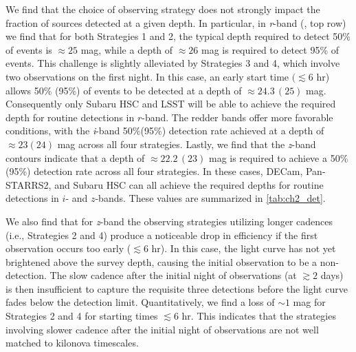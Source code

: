 \clearpage
We find that the choice of observing strategy does not strongly impact the fraction of sources detected at a given depth. In particular, in {\em r}-band (, top row) we find that for both Strategies 1 and 2, the typical depth required to detect 50\% of events is $\approx25$ mag, while a depth of $\approx26$ mag is required to detect 95\% of events. This challenge is slightly alleviated by Strategies 3 and 4, which involve two observations on the first night. In this case, an early start time $(\lesssim 6$ hr) allows 50\% (95\%) of events to be detected at a depth of $\approx24.3\,(25)$ mag. Consequently only Subaru HSC and LSST will be able to achieve the required depth for routine detections in $r$-band. The redder bands offer more favorable conditions, with the {\em i}-band 50\%(95\%) detection rate achieved at a depth of $\approx 23(24)$ mag across all four strategies. Lastly, we find that the {\em z}-band contours indicate that a depth of $\approx22.2\,(23)$ mag is required to achieve a 50\% (95\%) detection rate across all four strategies. In these cases, DECam, Pan-STARRS2, and Subaru HSC can all achieve the required depths for routine detections in $i$- and $z$-bands.  These values are summarized in \cref{tab:ch2_det}.

We also find that for {\em z}-band the observing strategies utilizing longer cadences (i.e., Strategies 2 and 4) produce a noticeable drop in efficiency if the first observation occurs too early ($\lesssim 6$ hr). In this case, the light curve has not yet brightened above the survey depth, causing the initial observation to be a non-detection. The slow cadence after the initial night of observations (at $\gtrsim2$ days) is then insufficient to capture the requisite three detections before the light curve fades below the detection limit. Quantitatively, we find a loss of $\sim 1$ mag for Strategies 2 and 4 for starting times $\lesssim 6$ hr. This indicates that the strategies involving slower cadence after the initial night of observations are not well matched to kilonova timescales.

